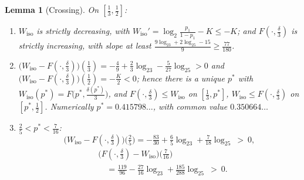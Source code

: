 \documentclass[journal]{IEEEtran}
\newtheorem{lemma}{Lemma}
\theoremstyle{definition}
\newcommand{\lgg}{\log_2}
\begin{document}
\begin{lemma}[Crossing]\label{lem:cross}
On $[\tfrac13,\tfrac12]$:
\begin{enumerate}
\item[\textup{(a)}] $W_{\mathrm{iso}}$ is strictly decreasing, with
  $W_{\mathrm{iso}}'=\lgg\tfrac{p_1}{1-p_1}-K\le-K$; and $F(\cdot,\tfrac\delta3)$
  is strictly increasing, with slope at least
  $\tfrac{9\lgg3+2\lgg5-15}{9}\ge\tfrac{77}{180}$.
\item[\textup{(b)}] $\bigl(W_{\mathrm{iso}}-F(\cdot,\tfrac\delta3)\bigr)(\tfrac13)
  =-\tfrac49+\tfrac23\lgg3-\tfrac5{27}\lgg5>0$ and
  $\bigl(W_{\mathrm{iso}}-F(\cdot,\tfrac\delta3)\bigr)(\tfrac12)=-\tfrac K2<0$;
  hence there is a unique $p^*$ with
  $W_{\mathrm{iso}}(p^*)=F\bigl(p^*,\tfrac{\delta(p^*)}3\bigr)$, and
  $F(\cdot,\tfrac\delta3)\le W_{\mathrm{iso}}$ on $[\tfrac13,p^*]$,
  $W_{\mathrm{iso}}\le F(\cdot,\tfrac\delta3)$ on $[p^*,\tfrac12]$. Numerically
  $p^*=0.415798\ldots$, with common value $0.350664\ldots$
\item[\textup{(c)}] $\tfrac25<p^*<\tfrac7{16}$:
\[
  \bigl(W_{\mathrm{iso}}-F(\cdot,\tfrac\delta3)\bigr)\bigl(\tfrac25\bigr)
  =-\tfrac{83}{30}+\tfrac65\lgg3+\tfrac7{18}\lgg5\ >\ 0,
\]
\[
\begin{aligned}
  &\bigl(F(\cdot,\tfrac\delta3)-W_{\mathrm{iso}}\bigr)\bigl(\tfrac7{16}\bigr)\\
  &\quad=\tfrac{119}{96}-\tfrac{27}{16}\lgg3+\tfrac{185}{288}\lgg5\ >\ 0 .
\end{aligned}
\]
\end{enumerate}
\end{lemma}
\end{document}

